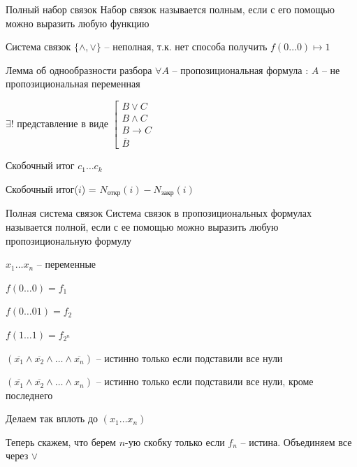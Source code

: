 \documentclass[12pt]{article}
\begin{document}
\begin{defin}{Полный набор связок}
    Набор связок называется полным, если с его помощью можно выразить любую функцию
\end{defin}

\begin{Example}{}
    Система связок $\{\land, \lor\}$ -- неполная, т.к. нет способа получить $f(0 \ldots 0) \mapsto 1$
\end{Example}

\begin{lem}{Лемма об однообразности разбора}
    $\forall A$ -- пропозициональная формула : $A$ -- не пропозициональная переменная 
    
    $\exists!$ представление в виде $\left[ \begin{gathered}
        B \lor C \\
        B \land C \\
        B \to C \\
        \overline{B}
    \end{gathered} \right.$
\end{lem}

\begin{defin}{Скобочный итог}
    $c_1 \ldots c_k$

    Скобочный итог($i$) = $N_\text{откр}(i) - N_\text{закр}(i)$
\end{defin}

\begin{defin}{Полная система связок}
    Система связок в пропозициональных формулах называется полной, если с ее помощью можно выразить любую пропозициональную формулу
\end{defin}

$x_1 \ldots x_n$ -- переменные

$f(0 \ldots 0) = f_1$

$f(0 \ldots 0 1) = f_2$

$f(1 \ldots 1) = f_{2^n}$

$(\overline{x_1} \land \overline{x_2} \land \ldots \land \overline{x_n})$ -- истинно только если подставили все нули

$(\overline{x_1} \land \overline{x_2} \land \ldots \land x_n)$ -- истинно только если подставили все нули, кроме последнего

Делаем так вплоть до $(x_1 \ldots x_n)$

Теперь скажем, что берем $n$-ую скобку только если $f_n$ -- истина. Объединяем все через $\lor$
\end{document}
